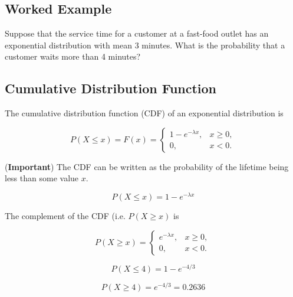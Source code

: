 \documentclass[a4paper,12pt]{article}
\begin{document}

\Large 
\subsection*{Worked Example}
Suppose that the service time for a customer at a fast-food outlet
has an exponential distribution with mean 3 minutes. What is the probability that a
customer waits more than 4 minutes?
\begin{framed}
\subsection*{Cumulative Distribution Function}
\noindent The cumulative distribution function (CDF) of an exponential distribution is

\[
P(X \leq x) = F(x) = \begin{cases}
1-e^{-\lambda x}, & x \ge 0, \\
0, & x < 0.
\end{cases}\]
\medskip 

\noindent (\textbf{Important}) The CDF can be written as the probability of the lifetime being less than some value $x$.

\[ P(X \leq x) = 1-e^{-\lambda x} \]

\medskip

\noindent The complement of the CDF (i.e. $P(X \geq x)$ is

\[
P(X \geq x) = \begin{cases}
e^{-\lambda x}, & x \ge 0, \\
0, & x < 0.
\end{cases}\]
\end{framed}
\newpage 

\[ P(X  \leq 4) = 1 -  e^{-4/3} \]

\[ P(X  \geq 4) = e^{-4/3} = 0.2636 \]
\end{document}
